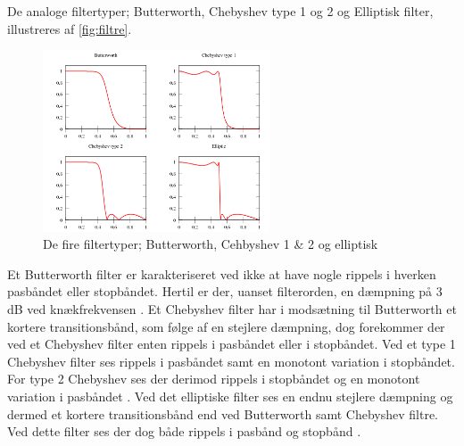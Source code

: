 De analoge filtertyper; Butterworth, Chebyshev type 1 og 2 og Elliptisk filter, illustreres af \autoref{fig:filtre}.

\begin{figure}[H]
\centering
\includegraphics[width=0.6\textwidth]{figures/filtre}
\caption{De fire filtertyper; Butterworth, Cehbyshev 1 \& 2 og elliptisk \citep{wikipedia2016}}
\label{fig:filtre}
\end{figure}

Et Butterworth filter er karakteriseret ved ikke at have nogle rippels i hverken pasbåndet eller stopbåndet. Hertil er der, uanset filterorden, en dæmpning på 3 dB ved knækfrekvensen \citep{nilsson2015}.
Et Chebyshev filter har i modsætning til Butterworth et kortere transitionsbånd, som følge af en stejlere dæmpning, dog forekommer der ved et Chebyshev filter enten rippels i pasbåndet eller i stopbåndet. Ved et type 1 Chebyshev filter ses rippels i pasbåndet samt en monotont variation i stopbåndet. For type 2 Chebyshev ses der derimod rippels i stopbåndet og en monotont variation i pasbåndet \citep{nilsson2015}. 
Ved det elliptiske filter ses en endnu stejlere dæmpning og dermed et kortere transitionsbånd end ved Butterworth samt Chebyshev filtre. Ved dette filter ses der dog både rippels i pasbånd og stopbånd \citep{nilsson2015}. 
